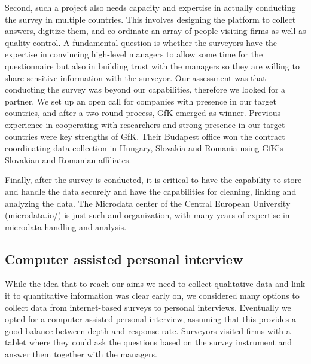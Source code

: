 \usepackage{}\documentclass[final, dvipsnames, authoryear,12pt]{elsarticle}
\begin{document}
Second, such a project also needs capacity and expertise in actually conducting the survey in multiple countries. This involves designing the platform to collect answers, digitize them, and co-ordinate an array of people visiting firms as well as quality control. A fundamental question is whether the surveyors have the expertise in convincing high-level managers to allow some time for the questionnaire but also in building trust with the managers so they are willing to share sensitive information with the surveyor. Our assessment was that conducting the survey was beyond our capabilities, therefore we looked for a partner. We set up an open call for companies with presence in our target countries, and after a two-round process, GfK emerged as winner. Previous experience in cooperating with researchers and strong presence in our target countries were key strengths of GfK. Their Budapest office won the contract coordinating data collection in Hungary, Slovakia and Romania using GfK's Slovakian and Romanian affiliates. 


Finally, after the survey is conducted, it is critical to have the capability to store and handle the data securely and have the capabilities for cleaning, linking and analyzing the data. The Microdata center of the Central European University (microdata.io/) is just such and organization, with many years of expertise in microdata handling and analysis. 


\subsection{Computer assisted personal interview}

While the idea that to reach our aims we need to collect qualitative data and link it to quantitative information was clear early on, we considered many options to collect data from internet-based surveys to personal interviews. Eventually we opted for a computer assisted personal interview, assuming that this provides a good balance between depth and response rate. Surveyors visited firms with a tablet where they could ask the questions based on the survey instrument and answer them together with the managers.
\end{document}

